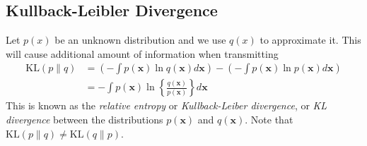 \documentclass[../main.tex]{subfiles}
\begin{document}
        \subsection{Kullback-Leibler Divergence}
            Let $p(x)$ be an unknown distribution and we use $q(x)$ to approximate it. This will cause additional amount of information when transmitting
            \begin{align*}
                \mathrm{KL}(p\|q)&=\left(-\int p(\mathbf{x})\ln q(\mathbf{x})d\mathbf{x}\right) - \left(-\int p(\mathbf{x})\ln p(\mathbf{x})d\mathbf{x}\right)\\
                                 &=-\int p(\mathbf{x})\ln \left\{\frac{q(\mathbf{x})}{p(\mathbf{x})}\right\}d\mathbf{x}
            \end{align*}
            This is known as the \textit{relative entropy} or \textit{Kullback-Leiber divergence}, or \textit{KL divergence} between the distributions $p(\mathbf{x})$ and $q(\mathbf{x})$. Note that $\mathrm{KL}(p\|q)\neq\mathrm{KL}(q\|p)$.
\end{document}
